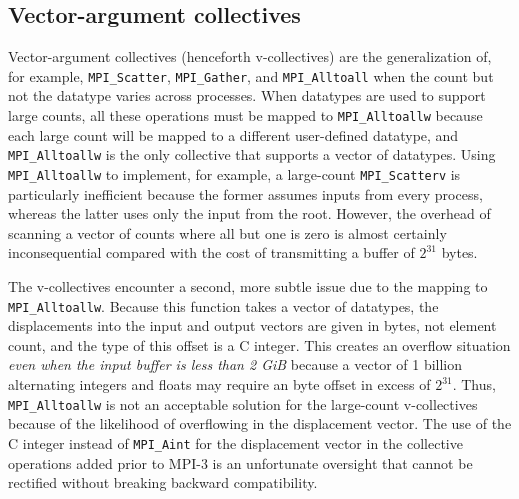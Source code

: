 
\subsection{Vector-argument collectives}

Vector-argument collectives (henceforth v-collectives) are the generalization of, 
for example, \texttt{MPI\_Scatter}, \texttt{MPI\_Gather}, and \texttt{MPI\_Alltoall}
when the count but not the datatype varies across processes.
When datatypes are used to support large counts, all  these operations must be
mapped to \texttt{MPI\_Alltoallw} because each large count will be mapped
to a different user-defined datatype, and \texttt{MPI\_Alltoallw} is the only collective
that supports a vector of datatypes.
Using \texttt{MPI\_Alltoallw} to implement, for example, a large-count \texttt{MPI\_Scatterv} is
particularly inefficient because the former assumes inputs from every process,
whereas the latter uses only the input from the root.
However, the overhead of scanning a vector of counts where all but one is zero
is almost certainly inconsequential compared with the cost of transmitting a buffer 
of $2^{31}$ bytes.


The v-collectives encounter a second, more subtle issue due to the mapping to
\texttt{MPI\_Alltoallw}.  Because this function takes a vector of datatypes, the
displacements into the input and output vectors are given in bytes,
not element count, and the type of this offset is a C integer.
This creates an overflow situation \textit{even 
when the input buffer is less than 2 GiB} because a vector of 1 billion
alternating integers and floats may require an byte offset in excess of $2^{31}$.
Thus, \texttt{MPI\_Alltoallw} is not an acceptable solution for the large-count
v-collectives because of the likelihood of overflowing in the displacement vector.
The use of the  C integer instead of \texttt{MPI\_Aint} for the displacement vector in
the  collective operations added prior to MPI-3 is an unfortunate oversight that
cannot be rectified without breaking backward compatibility.


